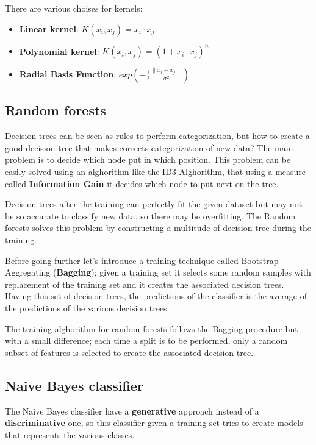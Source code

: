 \documentclass[12pt]{article}
\begin{document}
There are various choises for kernels:
\begin{itemize}
    \item \textbf{Linear kernel}: $K(x_i, x_j) = x_i \cdot x_j$
    \item \textbf{Polynomial kernel}: $K(x_i, x_j) = (1 + x_i \cdot x_j)^n$
    \item \textbf{Radial Basis Function}: $exp(- \frac{1}{2} \frac{\|x_i-x_j\|}{\sigma^2})$
\end{itemize}

\subsection{Random forests}

Decision trees can be seen as rules to perform categorization, but how to create a
good decision tree that makes corrects categorization of new data? The main
problem is to decide which node put in which position. This problem can be easily
solved using an alghorithm like the ID3 Alghorithm, that using a measure 
called \textbf{Information Gain} it decides which node to put next on the tree.

Decision trees after the training can perfectly fit the given dataset but may
not be so accurate to classify new data, so there may be overfitting.
The Random forests solves this problem by constructing a multitude of 
decision tree during the training.

Before going further let's introduce a training technique called 
Bootstrap Aggregating (\textbf{Bagging}); given a training set it 
selects some random samples with replacement of the training set and it creates the 
associated decision trees. Having this set of decision trees, the predictions of the 
classifier is the average of the predictions of the various decision trees.

The training alghorithm for random forests follows the 
Bagging procedure but with a small difference; each time a split is to be performed, only a random subset of features is
selected to create the associated decision tree. 

\subsection{Naive Bayes classifier}

The Naive Bayes classifier have a \textbf{generative} approach instead of a 
\textbf{discriminative} one,
so this classifier given a training set tries to create models that represents the
various classes.
 
\end{document}
